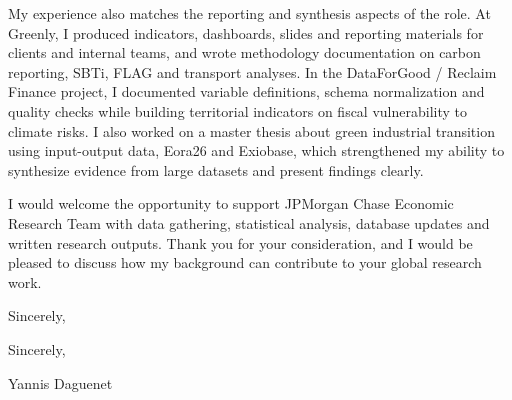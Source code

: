 \documentclass[11pt,a4paper]{article}
\begin{document}
\vspace{0.18cm}
My experience also matches the reporting and synthesis aspects of the role. At Greenly, I produced indicators, dashboards, slides and reporting materials for clients and internal teams, and wrote methodology documentation on carbon reporting, SBTi, FLAG and transport analyses. In the DataForGood / Reclaim Finance project, I documented variable definitions, schema normalization and quality checks while building territorial indicators on fiscal vulnerability to climate risks. I also worked on a master thesis about green industrial transition using input-output data, Eora26 and Exiobase, which strengthened my ability to synthesize evidence from large datasets and present findings clearly.

\vspace{0.18cm}
I would welcome the opportunity to support JPMorgan Chase Economic Research Team with data gathering, statistical analysis, database updates and written research outputs. Thank you for your consideration, and I would be pleased to discuss how my background can contribute to your global research work.

\vspace{0.18cm}
Sincerely,


\vspace{0.22cm}

Sincerely,

\vspace{0.28cm}

Yannis Daguenet
\end{document}

